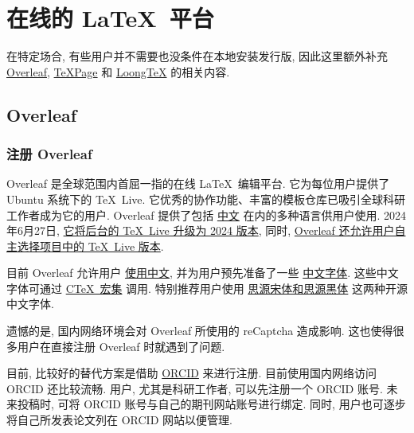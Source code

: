 
\chapter{在线的 \LaTeX\ 平台}

在特定场合,
有些用户并不需要也没条件在本地安装发行版,
因此这里额外补充 \href{www.overleaf.com}{Overleaf},
\href{https://www.texpage.com}{TeXPage} 和
\href{https://www.loongtex.com}{LoongTeX} 的相关内容.

\section{Overleaf}

\subsection{注册 Overleaf}

Overleaf 是全球范围内首屈一指的在线 \LaTeX\ 编辑平台.
它为每位用户提供了 Ubuntu 系统下的 \TeX~Live.
它优秀的协作功能、丰富的模板仓库已吸引全球科研工作者成为它的用户.
Overleaf 提供了包括%
\href{https://cn.overleaf.com}{中文}%
在内的多种语言供用户使用.
2024年6月27日,
\href{https://www.overleaf.com/blog/tex-live-2024-is-now-available}{它将后台的 \TeX~Live 升级为 2024 版本},
同时,
\href{https://www.overleaf.com/blog/new-feature-select-your-tex-live-compiler-version}{Overleaf 还允许用户自主选择项目中的 \TeX~Live 版本}.

目前 Overleaf 允许用户%
\href{https://www.overleaf.com/learn/latex/Chinese}{使用中文},
并为用户预先准备了一些%
\href{https://www.overleaf.com/learn/latex/Questions/Which_OTF_or_TTF_fonts_are_supported_via_fontspec%3F#Fonts_for_CJK}{中文字体}.
这些中文字体可通过%
\href{https://www.overleaf.com/latex/templates/using-the-ctex-package-on-overleaf-zai-overleafping-tai-shang-shi-yong-ctex/gndvpvsmjcqx}{C\TeX\ 宏集}%
调用.
特别推荐用户使用%
\href{https://www.overleaf.com/latex/examples/demonstration-of-noto-serif-cjk-and-noto-sans-cjk-fonts/sgrwgcddtqsq}{思源宋体和思源黑体}%
这两种开源中文字体.

遗憾的是,
国内网络环境会对 Overleaf 所使用的 reCaptcha 造成影响.
这也使得很多用户在直接注册 Overleaf 时就遇到了问题.

目前,
比较好的替代方案是借助 \href{https://orcid.org}{ORCID} 来进行注册.
目前使用国内网络访问 ORCID 还比较流畅.
用户, 尤其是科研工作者, 可以先注册一个 ORCID 账号.
未来投稿时,
可将 ORCID 账号与自己的期刊网站账号进行绑定.
同时,
用户也可逐步将自己所发表论文列在 ORCID 网站以便管理.

